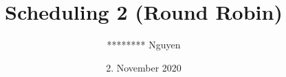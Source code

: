 \usepackage[utf8]{inputenc}
\usepackage[T1]{fontenc}
\usepackage{bookmark}

\usepackage{csquotes}
\usepackage{dirtytalk} %
\usepackage{hyperref}
\usepackage{wrapfig}
\usepackage[ngerman]{babel}
\usepackage{adjustbox}
\usepackage{appendixnumberbeamer}

\usepackage[backend=biber,sorting=none]{biblatex}





\title{Scheduling 2 (Round Robin)}
\subtitle{}
\author{******** Nguyen}
\date{2. November 2020}
